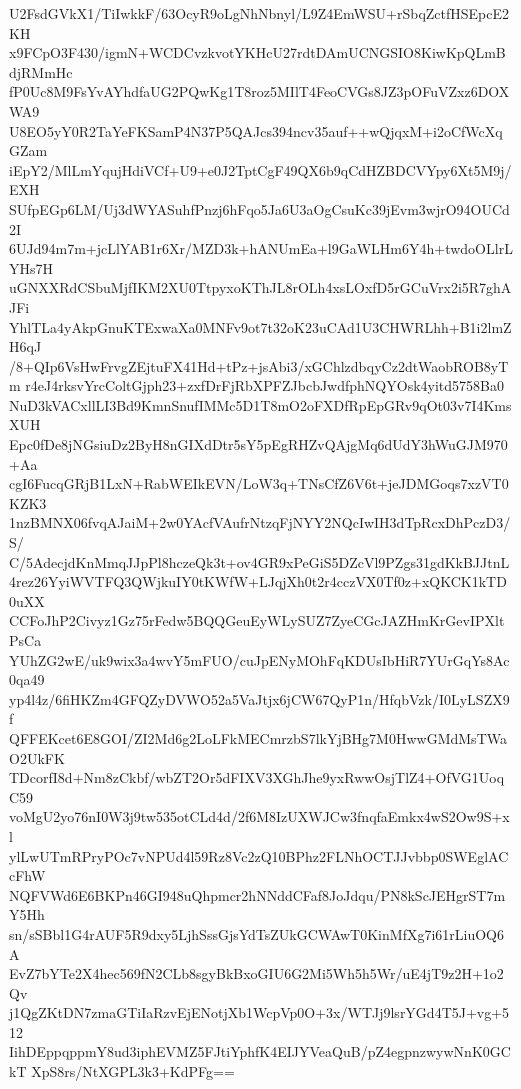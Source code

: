 U2FsdGVkX1/TiIwkkF/63OcyR9oLgNhNbnyl/L9Z4EmWSU+rSbqZctfHSEpcE2KH
x9FCpO3F430/igmN+WCDCvzkvotYKHcU27rdtDAmUCNGSIO8KiwKpQLmBdjRMmHc
fP0Uc8M9FsYvAYhdfaUG2PQwKg1T8roz5MIlT4FeoCVGs8JZ3pOFuVZxz6DOXWA9
U8EO5yY0R2TaYeFKSamP4N37P5QAJcs394ncv35auf++wQjqxM+i2oCfWcXqGZam
iEpY2/MlLmYqujHdiVCf+U9+e0J2TptCgF49QX6b9qCdHZBDCVYpy6Xt5M9j/EXH
SUfpEGp6LM/Uj3dWYASuhfPnzj6hFqo5Ja6U3aOgCsuKc39jEvm3wjrO94OUCd2I
6UJd94m7m+jcLlYAB1r6Xr/MZD3k+hANUmEa+l9GaWLHm6Y4h+twdoOLlrLYHs7H
uGNXXRdCSbuMjfIKM2XU0TtpyxoKThJL8rOLh4xsLOxfD5rGCuVrx2i5R7ghAJFi
YhlTLa4yAkpGnuKTExwaXa0MNFv9ot7t32oK23uCAd1U3CHWRLhh+B1i2lmZH6qJ
/8+QIp6VsHwFrvgZEjtuFX41Hd+tPz+jsAbi3/xGChlzdbqyCz2dtWaobROB8yTm
r4eJ4rksvYrcColtGjph23+zxfDrFjRbXPFZJbcbJwdfphNQYOsk4yitd5758Ba0
NuD3kVACxllLI3Bd9KmnSnufIMMc5D1T8mO2oFXDfRpEpGRv9qOt03v7I4KmsXUH
Epc0fDe8jNGsiuDz2ByH8nGIXdDtr5sY5pEgRHZvQAjgMq6dUdY3hWuGJM970+Aa
cgI6FucqGRjB1LxN+RabWEIkEVN/LoW3q+TNsCfZ6V6t+jeJDMGoqs7xzVT0KZK3
1nzBMNX06fvqAJaiM+2w0YAcfVAufrNtzqFjNYY2NQcIwIH3dTpRcxDhPczD3/S/
C/5AdecjdKnMmqJJpPl8hczeQk3t+ov4GR9xPeGiS5DZcVl9PZgs31gdKkBJJtnL
4rez26YyiWVTFQ3QWjkuIY0tKWfW+LJqjXh0t2r4cczVX0Tf0z+xQKCK1kTD0uXX
CCFoJhP2Civyz1Gz75rFedw5BQQGeuEyWLySUZ7ZyeCGcJAZHmKrGevIPXltPsCa
YUhZG2wE/uk9wix3a4wvY5mFUO/cuJpENyMOhFqKDUsIbHiR7YUrGqYs8Ac0qa49
yp4l4z/6fiHKZm4GFQZyDVWO52a5VaJtjx6jCW67QyP1n/HfqbVzk/I0LyLSZX9f
QFFEKcet6E8GOI/ZI2Md6g2LoLFkMECmrzbS7lkYjBHg7M0HwwGMdMsTWaO2UkFK
TDcorfI8d+Nm8zCkbf/wbZT2Or5dFIXV3XGhJhe9yxRwwOsjTlZ4+OfVG1UoqC59
voMgU2yo76nI0W3j9tw535otCLd4d/2f6M8IzUXWJCw3fnqfaEmkx4wS2Ow9S+xl
ylLwUTmRPryPOc7vNPUd4l59Rz8Vc2zQ10BPhz2FLNhOCTJJvbbp0SWEglACcFhW
NQFVWd6E6BKPn46GI948uQhpmcr2hNNddCFaf8JoJdqu/PN8kScJEHgrST7mY5Hh
sn/sSBbl1G4rAUF5R9dxy5LjhSssGjsYdTsZUkGCWAwT0KinMfXg7i61rLiuOQ6A
EvZ7bYTe2X4hec569fN2CLb8sgyBkBxoGIU6G2Mi5Wh5h5Wr/uE4jT9z2H+1o2Qv
j1QgZKtDN7zmaGTiIaRzvEjENotjXb1WcpVp0O+3x/WTJj9lsrYGd4T5J+vg+512
IihDEppqppmY8ud3iphEVMZ5FJtiYphfK4EIJYVeaQuB/pZ4egpnzwywNnK0GCkT
XpS8rs/NtXGPL3k3+KdPFg==
